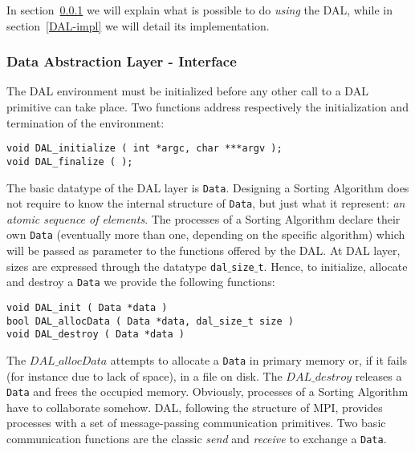 
In section~\ref{DAL-int} we will explain what is possible to do \textit{using} the DAL, while in section~\ref{DAL-impl} we will detail its implementation. 

\subsubsection{Data Abstraction Layer - Interface}
\label{DAL-int}
The DAL environment must be initialized before any other call to a DAL primitive can take place. Two functions address respectively the initialization and termination of the environment:
\begin{lstlisting}
void DAL_initialize ( int *argc, char ***argv );
void DAL_finalize ( );
\end{lstlisting}
The basic datatype of the DAL layer is \texttt{Data}. Designing a Sorting Algorithm does not require to know the internal structure of \texttt{Data}, but just what it represent: \textit{an atomic sequence of elements}. The processes of a Sorting Algorithm declare their own \texttt{Data} (eventually more than one, depending on the specific algorithm) which will be passed as parameter to the functions offered by the DAL. At DAL layer, sizes are expressed through the datatype \texttt{dal$\_$size$\_$t}. Hence, to initialize, allocate and destroy a \texttt{Data} we provide the following functions:
\begin{lstlisting}
void DAL_init ( Data *data )
bool DAL_allocData ( Data *data, dal_size_t size )
void DAL_destroy ( Data *data )
\end{lstlisting}
The $DAL\_allocData$ attempts to allocate a \texttt{Data} in primary memory or, if it fails (for instance due to lack of space), in a file on disk. The $DAL\_destroy$ releases a \texttt{Data} and frees the occupied memory. 
Obviously, processes of a Sorting Algorithm have to collaborate somehow. DAL, following the structure of MPI, provides processes with a set of message-passing communication primitives. Two basic communication functions are the classic \textit{send} and \textit{receive} to exchange a \texttt{Data}.

